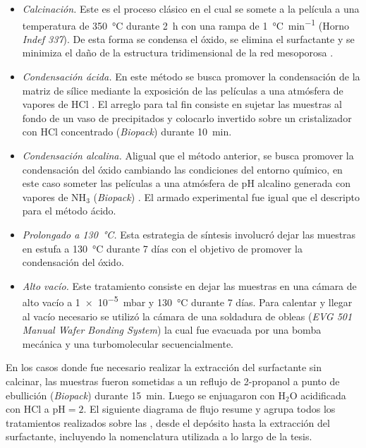 				\begin{itemize}

				\item \textit{Calcinación.} Este es el proceso clásico en el cual se somete a la película a una temperatura de \SI{350}{\celsius} durante \SI{2}{\hour} con una rampa de \SI{1}{\celsius.\minute^{-1}} (Horno \textit{Indef 337}). De esta forma se condensa el óxido, se elimina el surfactante y se minimiza el daño de la estructura tridimensional de la red mesoporosa \cite{Crepaldi2003}.

				\item \textit{Condensación ácida.} En este método se busca promover la condensación de la matriz de sílice mediante la exposición de las películas a una atmósfera de vapores de HCl \cite{Doshi2000a}. El arreglo para tal fin consiste en sujetar las muestras al fondo de un vaso de precipitados y colocarlo invertido sobre un cristalizador con HCl concentrado (\textit{Biopack}) durante \SI{10}{\minute}. 

				\item \textit{Condensación alcalina.} Al\space igual que el método anterior, se busca promover la condensación del óxido cambiando las condiciones del entorno químico, en este caso someter las películas a una atmósfera de pH alcalino generada con vapores de NH$_3$ (\textit{Biopack}) \cite{Soler-Illia2012,Soler-Illia2011}. El armado experimental fue igual que el descripto para el método ácido.

				\item \textit{Prolongado a \SI{130}{\celsius}.} Esta estrategia de síntesis involucró dejar las muestras en estufa a \SI{130}{\celsius} durante 7 días con el objetivo de promover la condensación del óxido.

				\item \textit{Alto vacío.} Este tratamiento consiste en dejar las muestras en una cámara de alto vacío a \SI{1e-5}{\milli\bar} y \SI{130}{\celsius} durante 7 días. Para calentar y llegar al vacío necesario se utilizó la cámara de una soldadura de obleas (\textit{EVG 501 Manual Wafer Bonding System}) la cual fue evacuada por una bomba mecánica y una turbomolecular secuencialmente.

				\end{itemize}
					
		En los casos donde fue necesario realizar la extracción del surfactante sin calcinar, las muestras fueron sometidas a un reflujo de 2-propanol a punto de ebullición (\textit{Biopack}) durante \SI{15}{\minute}. Luego se enjuagaron con H$_2$O acidificada con HCl a $\text{pH}=2$. El siguiente diagrama de flujo resume y agrupa todos los tratamientos realizados sobre las \pdm, desde el depósito hasta la extracción del surfactante, incluyendo la nomenclatura utilizada a lo largo de la tesis.
		

